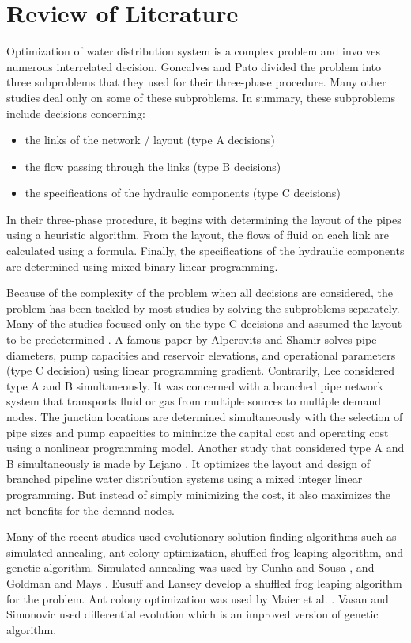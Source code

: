 \section{Review of Literature}
Optimization of water distribution system is a complex problem and involves numerous interrelated decision. Goncalves and Pato \cite{Goncalves2000} divided the problem into three subproblems that they used for their three-phase procedure. Many other studies deal only on some of these subproblems. In summary, these subproblems include decisions concerning:
\begin{itemize}
    \item the links of the network / layout (type A decisions)
    \item the flow passing through the links (type B decisions)
    \item the specifications of the hydraulic components (type C decisions)
\end{itemize}
In their three-phase procedure, it begins with determining the layout of the pipes using a heuristic algorithm. From the layout, the flows of fluid on each link are calculated using a formula. Finally, the specifications of the hydraulic components are determined using mixed binary linear programming.

Because of the complexity of the problem when all decisions are considered, the problem has been tackled by most studies by solving the subproblems separately. Many of the studies focused only on the type C decisions and assumed the layout to be predetermined \cite{Goncalves2000,Lee1984,Lejano2006}. A famous paper by Alperovits and Shamir \cite{Alperovits1977} solves pipe diameters, pump capacities and reservoir elevations, and operational parameters (type C decision) using linear programming gradient. Contrarily, Lee \cite{Lee1984} considered type A and B simultaneously. It was concerned with a branched pipe network system that transports fluid or gas from multiple sources to multiple demand nodes. The junction locations are determined simultaneously with the selection of pipe sizes and pump capacities to minimize the capital cost and operating cost using a nonlinear programming model. Another study that considered type A and B simultaneously is made by Lejano \cite{Lejano2006}. It optimizes the layout and design of branched pipeline water distribution systems using a mixed integer linear programming. But instead of simply minimizing the cost, it also maximizes the net benefits for the demand nodes.

Many of the recent studies used evolutionary solution finding algorithms such as simulated annealing, ant colony optimization, shuffled frog leaping algorithm, and genetic algorithm. Simulated annealing was used by Cunha and Sousa \cite{Cunha1999}, and Goldman and Mays \cite{Goldman2005}. Eusuff and Lansey \cite{Eusuff2003} develop a shuffled frog leaping algorithm for the problem. Ant colony optimization was used by Maier et al. \cite{Maier2003}. Vasan and Simonovic \cite{Vasan2010} used differential evolution which is an improved version of genetic algorithm.

